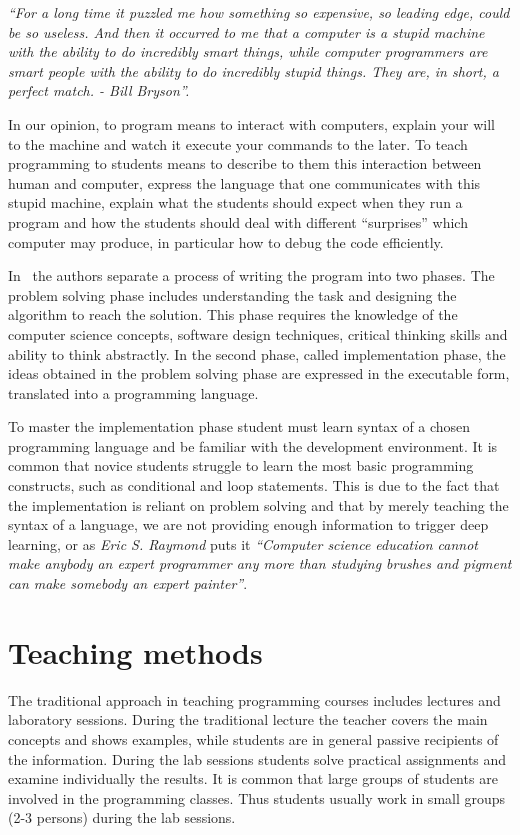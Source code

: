 \documentclass{article}
\begin{document}
\emph{``For a long time it puzzled me how something so expensive, so leading edge,
could be so useless. And then it occurred to me that a computer is a stupid
machine with the ability to do incredibly smart things, while computer
programmers are smart people with the ability to do incredibly stupid things.
They are, in short, a perfect match. - Bill Bryson''.}

In our opinion, to program means to interact with computers, explain your will
to the machine and watch it execute your commands to the later. To teach
programming to students means to describe to them this interaction between human
and computer, express the language that one communicates with this stupid
machine, explain what the students should expect when they run a program and how
the students should deal with different ``surprises'' which computer may
produce, in particular how to debug the code efficiently.

In~\cite{state_of_art} the authors separate a process of writing the program
into two phases. The problem solving phase includes understanding the task
and designing the algorithm to reach the solution. This phase requires the
knowledge of the computer science concepts, software design techniques, critical
thinking skills and ability to think abstractly. In the second phase, called
implementation phase, the ideas obtained in the problem solving phase are
expressed in the executable form, translated into a programming language.

To master the implementation phase student must learn syntax of a chosen
programming language and be familiar with the development environment. It is
common that novice students struggle to learn the most basic programming
constructs, such as conditional and loop statements. This is due to the fact
that the implementation is reliant on problem solving and that by merely
teaching the syntax of a language, we are not providing enough information to
trigger deep learning, or as \emph{Eric S. Raymond} puts it
\emph{``Computer science education cannot make anybody an expert programmer any
more than studying brushes and pigment can make somebody an expert painter''}.

\section{Teaching methods}
\label{sec:teaching_methods}

The traditional approach in teaching programming courses includes lectures and
laboratory sessions. During the traditional lecture the teacher covers the
main concepts and shows examples, while students are in general passive
recipients of the information. During the lab sessions students solve practical
assignments and examine individually the results. It is common that large groups
of students are involved in the programming classes. Thus students usually work
in small groups (2-3 persons) during the lab sessions.
\end{document}
